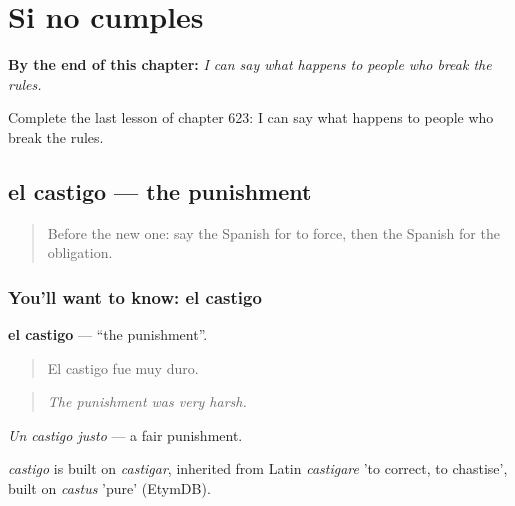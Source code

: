 
\chapter{Si no cumples}
\label{ch:es-si-no-cumples}

\begin{chapteropening}
\textbf{By the end of this chapter:} \emph{I can say what happens to people who break the rules.}

Complete the last lesson of chapter 623: I can say what happens to people who break the rules.
\end{chapteropening}

\section[el castigo]{el castigo — the punishment}

\label{lesson:ES-C623-castigo}



\begin{quote}
Before the new one: say the Spanish for to force, then the Spanish for the obligation.
\end{quote}

\subsection*{You'll want to know: el castigo}
\textbf{el castigo} — \textquotedblleft{}the punishment\textquotedblright{}.

\begin{quote}
El castigo fue muy duro.
\end{quote}

\begin{quote}
\emph{The punishment was very harsh.}
\end{quote}

\emph{Un castigo justo} — a fair punishment.

\begin{cousinweb}
\emph{castigo} is built on \emph{castigar}, inherited from Latin \emph{castigare} 'to correct, to chastise', built on \emph{castus} 'pure' (EtymDB).
\end{cousinweb}

